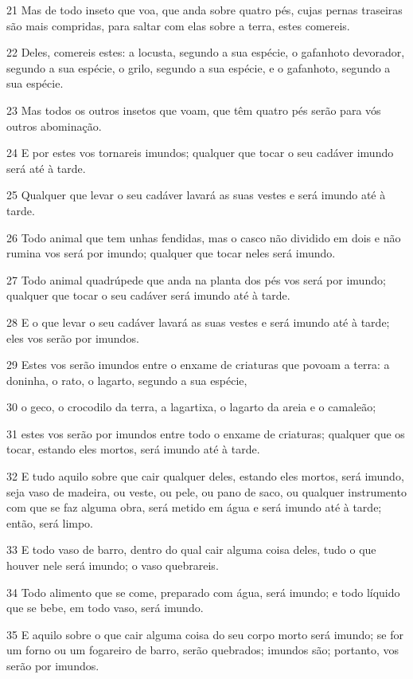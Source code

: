 \par 21 Mas de todo inseto que voa, que anda sobre quatro pés, cujas pernas traseiras são mais compridas, para saltar com elas sobre a terra, estes comereis.
\par 22 Deles, comereis estes: a locusta, segundo a sua espécie, o gafanhoto devorador, segundo a sua espécie, o grilo, segundo a sua espécie, e o gafanhoto, segundo a sua espécie.
\par 23 Mas todos os outros insetos que voam, que têm quatro pés serão para vós outros abominação.
\par 24 E por estes vos tornareis imundos; qualquer que tocar o seu cadáver imundo será até à tarde.
\par 25 Qualquer que levar o seu cadáver lavará as suas vestes e será imundo até à tarde.
\par 26 Todo animal que tem unhas fendidas, mas o casco não dividido em dois e não rumina vos será por imundo; qualquer que tocar neles será imundo.
\par 27 Todo animal quadrúpede que anda na planta dos pés vos será por imundo; qualquer que tocar o seu cadáver será imundo até à tarde.
\par 28 E o que levar o seu cadáver lavará as suas vestes e será imundo até à tarde; eles vos serão por imundos.
\par 29 Estes vos serão imundos entre o enxame de criaturas que povoam a terra: a doninha, o rato, o lagarto, segundo a sua espécie,
\par 30 o geco, o crocodilo da terra, a lagartixa, o lagarto da areia e o camaleão;
\par 31 estes vos serão por imundos entre todo o enxame de criaturas; qualquer que os tocar, estando eles mortos, será imundo até à tarde.
\par 32 E tudo aquilo sobre que cair qualquer deles, estando eles mortos, será imundo, seja vaso de madeira, ou veste, ou pele, ou pano de saco, ou qualquer instrumento com que se faz alguma obra, será metido em água e será imundo até à tarde; então, será limpo.
\par 33 E todo vaso de barro, dentro do qual cair alguma coisa deles, tudo o que houver nele será imundo; o vaso quebrareis.
\par 34 Todo alimento que se come, preparado com água, será imundo; e todo líquido que se bebe, em todo vaso, será imundo.
\par 35 E aquilo sobre o que cair alguma coisa do seu corpo morto será imundo; se for um forno ou um fogareiro de barro, serão quebrados; imundos são; portanto, vos serão por imundos.
